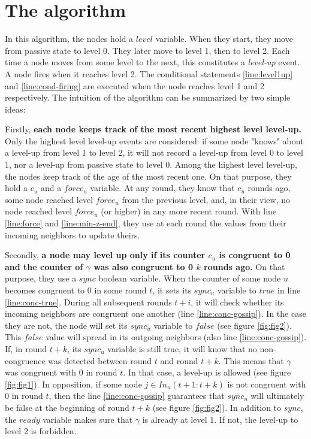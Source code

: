 \documentclass[11pt,letterpaper]{article}
\newcommand{\cent}{\gamma}
\begin{document}
\section{The algorithm}

In this algorithm, the nodes hold a $level$ variable. When they start, they move from passive state to level 0. They later move to level 1, then to level 2.
Each time a node moves from some level to the next, this constitutes a \textit{level-up} event.
A node fires when it reaches level 2.
The conditional statements \ref{line:level1up} and \ref{line:cond-firing} are executed when the node reaches level 1 and 2 respectively.
The intuition of the algorithm can be summarized by two simple ideas:

Firstly, \textbf{each node keeps track of the most recent highest level level-up.}
Only the highest level level-up events are considered: if some node "knows" about a level-up from level 1 to level 2,
it will not record a level-up from level 0 to level 1, nor a level-up from passive state to level 0.
Among the highest level level-up, the nodes keep track of the age of the most recent one.
On that purpose, they hold a $c_u$ and a $force_u$ variable.
At any round, they know that $c_u$ rounds ago, some node reached level $force_u$ from the previous level,
and, in their view, no node reached level $force_u$ (or higher) in any more recent round.
With line \ref{line:force} and \ref{line:min-z-end}, they use at each round the values from their incoming neighbors to update theirs.

Secondly, \textbf{a node may level up only if its counter $c_u$ is congruent to 0 and the counter of $\gamma$ was also congruent to 0 $k$ rounds ago.}
On that purpose, they use a $sync$ boolean variable.
When the counter of some node $u$ becomes congruent to 0 in some round $t$, it sets its $sync_u$ variable to $true$ in line \ref{line:conc-true}.
During all subsequent rounds $t+i$, it will check whether its incoming neighbors are congruent one another (line \ref{line:conc-gossip}).
In the case they are not, the node will set its $sync_u$ variable to $false$ (see figure \ref{fig:fig2}).
This $false$ value will spread in its outgoing neighbors (also line \ref{line:conc-gossip}).
If, in round $t+k$, its $sync_u$ variable is still true, it will know that no non-congruence was detected between round $t$ and round $t+k$.
This means that $\cent$ was congruent with 0 in round $t$.
In that case, a level-up is allowed (see figure \ref{fig:fig1}).
In opposition, if some node $j \in In_u(t+1:t+k)$ is not congruent with 0 in round $t$,
then the line \ref{line:conc-gossip} guarantees that $sync_u$ will ultimately be false at the beginning of round $t+k$ (see figure \ref{fig:fig2}).
In addition to $sync$, the $ready$ variable makes sure that $\cent$ is already at level 1.
If not, the level-up to level 2 is forbidden.
\end{document}
